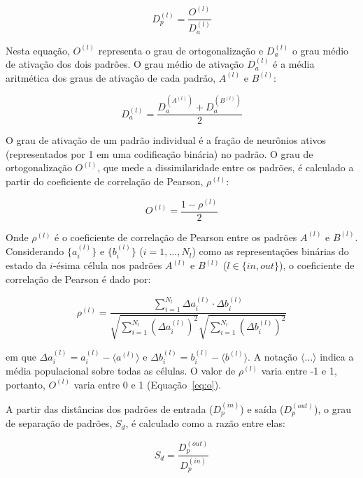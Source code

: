 \begin{equation}
    \label{eq:dp}
    D_p^{(l)} = \frac{O^{(l)}}{D_a^{(l)}}
\end{equation}

Nesta equação, $O^{(l)}$ representa o grau de ortogonalização e $D_a^{(l)}$ o grau médio de ativação dos dois padrões. O grau médio de ativação $D_a^{(l)}$ é a média aritmética dos graus de ativação de cada padrão, $A^{(l)}$ e $B^{(l)}$:

\begin{equation}
    \label{eq:da}
    D_a^{(l)} = \frac{D_a^{(A^{(l)})} + D_a^{(B^{(l)})}}{2}
\end{equation}

O grau de ativação de um padrão individual é a fração de neurônios ativos (representados por 1 em uma codificação binária) no padrão.
O grau de ortogonalização $O^{(l)}$, que mede a dissimilaridade entre os padrões, é calculado a partir do coeficiente de correlação de Pearson, $\rho^{(l)}$:

\begin{equation}
    \label{eq:o}
    O^{(l)} = \frac{1 - \rho^{(l)}}{2}
\end{equation}

Onde $\rho^{(l)}$ é o coeficiente de correlação de Pearson entre os padrões $A^{(l)}$ e $B^{(l)}$.
Considerando $\{a_i^{(l)}\}$ e $\{b_i^{(l)}\}$ ($i=1, \dots, N_l$) como as representações binárias do estado da $i$-ésima célula nos padrões $A^{(l)}$ e $B^{(l)}$ ($l \in \{in, out\}$), o coeficiente de correlação de Pearson é dado por:

\begin{equation}
    \label{eq:pearson}
    \rho^{(l)} = \frac{\sum_{i=1}^{N_l} \Delta a_i^{(l)} \cdot \Delta b_i^{(l)}}{\sqrt{\sum_{i=1}^{N_l} (\Delta a_i^{(l)})^2} \sqrt{\sum_{i=1}^{N_l} (\Delta b_i^{(l)})^2}}
\end{equation}

em que $\Delta a_i^{(l)} = a_i^{(l)} - \langle a^{(l)} \rangle$ e $\Delta b_i^{(l)} = b_i^{(l)} - \langle b^{(l)} \rangle$. A
notação $\langle \dots \rangle$ indica a média populacional sobre todas as células. O valor de $\rho^{(l)}$ varia entre -1 e 1,
portanto, $O^{(l)}$ varia entre 0 e 1 (Equação~\ref{eq:o}).

A partir das distâncias dos padrões de entrada ($D_p^{(in)}$) e saída ($D_p^{(out)}$), o grau de separação de padrões, $S_d$, é calculado como a razão entre elas:

\begin{equation}
    \label{eq:sd}
    S_d = \frac{D_p^{(out)}}{D_p^{(in)}}
\end{equation}

